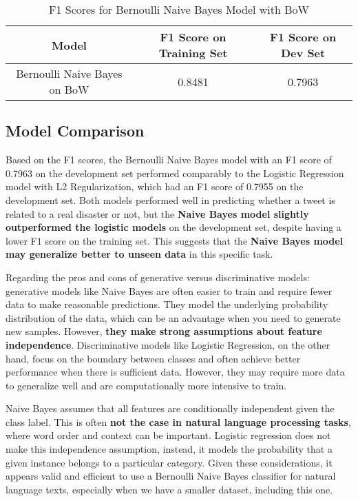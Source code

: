 \documentclass{article}
\begin{document}
\begin{table}[h]
    \centering
    \begin{tabular}{|c|c|c|}
        \hline
        \textbf{Model} & \textbf{F1 Score on Training Set} & \textbf{F1 Score on Dev Set} \\
        \hline
        Bernoulli Naive Bayes on BoW & 0.8481 & 0.7963 \\
        \hline
    \end{tabular}
    \caption{F1 Scores for Bernoulli Naive Bayes Model with BoW}
    \label{tab:results-nb-bow}
\end{table}


\subsection{Model Comparison}

Based on the F1 scores, the Bernoulli Naive Bayes model with an F1 score of 0.7963 on the development set performed comparably to the Logistic Regression model with L2 Regularization, which had an F1 score of 0.7955 on the development set. Both models performed well in predicting whether a tweet is related to a real disaster or not, but the \textbf{Naive Bayes model slightly outperformed the logistic models} on the development set, despite having a lower F1 score on the training set. This suggests that the \textbf{Naive Bayes model may generalize better to unseen data} in this specific task.

Regarding the pros and cons of generative versus discriminative models: generative models like Naive Bayes are often easier to train and require fewer data to make reasonable predictions. They model the underlying probability distribution of the data, which can be an advantage when you need to generate new samples. However, \textbf{they make strong assumptions about feature independence}. Discriminative models like Logistic Regression, on the other hand, focus on the boundary between classes and often achieve better performance when there is sufficient data. However, they may require more data to generalize well and are computationally more intensive to train.

Naive Bayes assumes that all features are conditionally independent given the class label. This is often \textbf{not the case in natural language processing tasks}, where word order and context can be important. Logistic regression does not make this independence assumption, instead, it models the probability that a given instance belongs to a particular category. Given these considerations, it appears valid and efficient to use a Bernoulli Naive Bayes classifier for natural language texts, especially when we have a smaller dataset, including this one. 
 
\end{document}
